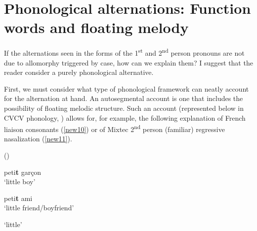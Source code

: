 \documentclass[output=paper]{langscibook}
\begin{document}
\section{Phonological alternations: Function words and floating melody}\label{sec:newell:3}

If the alternations seen in the forms of the 1\textsuperscript{st} and 2\textsuperscript{nd} person pronouns are not due to allomorphy triggered by case, how can we explain them? I suggest that the reader consider a purely phonological alternative. 

First, we must consider what type of phonological framework can neatly account for the alternation at hand. An autosegmental account is one that includes the possibility of floating melodic structure. Such an account (represented below in CVCV phonology, \citealt{lowenstamm1996cv,scheer2004lateral,scheer2009external}) allows for, for example, the following explanation of French liaison consonants (\ref{new10}) or of Mixtec 2\textsuperscript{nd} person (familiar) regressive nasalization (\ref{new11}).

\begin{exe}
\ex \label{new10}(\citealt{encreve1983liaison})
\begin{xlist}
\ex \label{new10a}
peti\textbf{t} garçon \\
\glt ‘little boy’ 

\ex \label{new10b}
peti\textbf{t} ami\\
\glt ‘little friend/boyfriend’

\ex \label{new10c}
\relax [pǝti]
\glt `little' \\
{
}

\end{xlist}
\end{exe}
\end{document}
